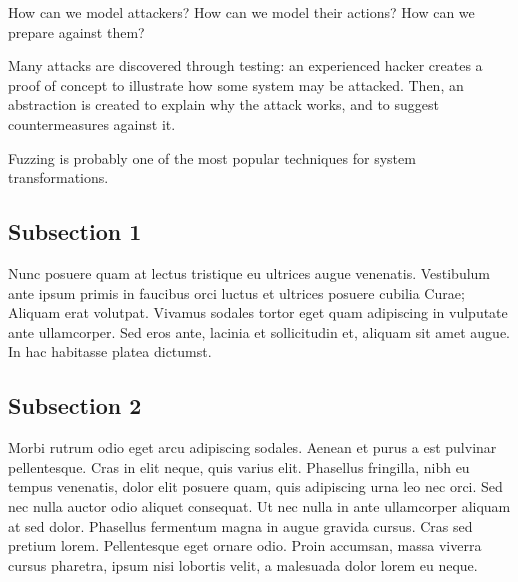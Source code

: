 How can we model attackers? How can we model their actions? How can we prepare against them?

Many attacks are discovered through testing: an experienced hacker creates a proof of concept to illustrate how some system may be attacked. Then, an abstraction is created to explain why the attack works, and to suggest countermeasures against it. 

Fuzzing is probably one of the most popular techniques for system transformations. 
\subsection{Subsection 1}

Nunc posuere quam at lectus tristique eu ultrices augue venenatis. Vestibulum ante ipsum primis in faucibus orci luctus et ultrices posuere cubilia Curae; Aliquam erat volutpat. Vivamus sodales tortor eget quam adipiscing in vulputate ante ullamcorper. Sed eros ante, lacinia et sollicitudin et, aliquam sit amet augue. In hac habitasse platea dictumst.


\subsection{Subsection 2}
Morbi rutrum odio eget arcu adipiscing sodales. Aenean et purus a est pulvinar pellentesque. Cras in elit neque, quis varius elit. Phasellus fringilla, nibh eu tempus venenatis, dolor elit posuere quam, quis adipiscing urna leo nec orci. Sed nec nulla auctor odio aliquet consequat. Ut nec nulla in ante ullamcorper aliquam at sed dolor. Phasellus fermentum magna in augue gravida cursus. Cras sed pretium lorem. Pellentesque eget ornare odio. Proin accumsan, massa viverra cursus pharetra, ipsum nisi lobortis velit, a malesuada dolor lorem eu neque.


